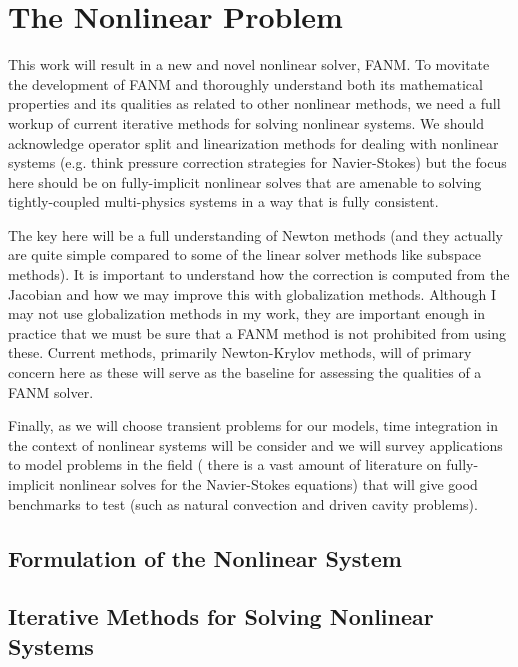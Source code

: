\chapter{The Nonlinear Problem}
\label{ch:nonlinear_problem}

This work will result in a new and novel nonlinear solver, FANM. To
movitate the development of FANM and thoroughly understand both its
mathematical properties and its qualities as related to other
nonlinear methods, we need a full workup of current iterative methods
for solving nonlinear systems. We should acknowledge operator split
and linearization methods for dealing with nonlinear systems
(e.g. think pressure correction strategies for Navier-Stokes) but the
focus here should be on fully-implicit nonlinear solves that are
amenable to solving tightly-coupled multi-physics systems in a way that
is fully consistent.

The key here will be a full understanding of Newton methods (and they
actually are quite simple compared to some of the linear solver
methods like subspace methods). It is important to understand how the
correction is computed from the Jacobian and how we may improve this
with globalization methods. Although I may not use globalization
methods in my work, they are important enough in practice that we must
be sure that a FANM method is not prohibited from using these. Current
methods, primarily Newton-Krylov methods, will of primary concern here
as these will serve as the baseline for assessing the qualities of a
FANM solver. 

Finally, as we will choose transient problems for our models, time
integration in the context of nonlinear systems will be consider and
we will survey applications to model problems in the field ( there is
a vast amount of literature on fully-implicit nonlinear solves for the
Navier-Stokes equations) that will give good benchmarks to test (such
as natural convection and driven cavity problems).

\section{Formulation of the Nonlinear System}
\label{sec:nonlinear_system}

\section{Iterative Methods for Solving Nonlinear Systems}
\label{sec:nonlinear_methods}

